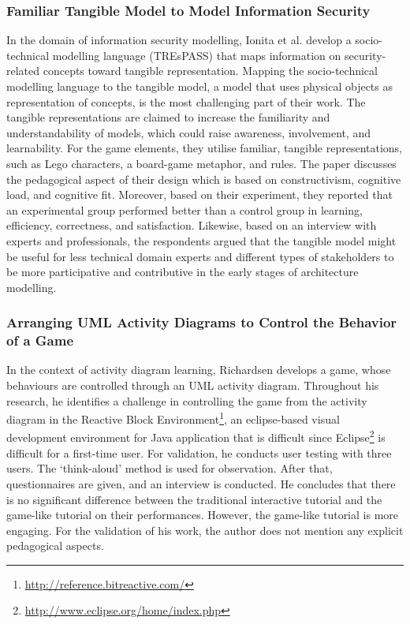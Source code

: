 \documentclass[12pt, a4paper]{report}
\begin{document}
{\subsubsection{Familiar Tangible Model to Model Information Security}
In the domain of information security modelling, Ionita et al.\cite{Ionita2015} develop a socio-technical modelling language (TREsPASS) that maps information on security-related concepts toward tangible representation. Mapping the socio-technical modelling language to the tangible model, a model that uses physical objects as representation of concepts, is the most challenging part of their work. The tangible representations are claimed to increase the familiarity and understandability of models, which could raise awareness, involvement, and learnability. For the game elements, they utilise familiar, tangible representations, such as Lego characters, a board-game metaphor, and rules. The paper discusses the pedagogical aspect of their design which is based on constructivism, cognitive load, and cognitive fit. Moreover, based on their experiment, they reported that an experimental group performed better than a control group in learning, efficiency, correctness, and satisfaction. Likewise, based on an interview with experts and professionals, the respondents argued that the tangible model might be useful for less technical domain experts and different types of stakeholders to be more participative and contributive in the early stages of architecture modelling.

\subsubsection{Arranging UML Activity Diagrams to Control the Behavior of a Game}
In the context of activity diagram learning, Richardsen \cite{Richardsen2014} develops a game, whose behaviours are controlled through an UML activity diagram. Throughout his research, he identifies a challenge in controlling the game from the activity diagram in the Reactive Block Environment\footnote{\url{http://reference.bitreactive.com/}}, an eclipse-based visual development environment for Java application that is difficult since Eclipse\footnote{\url{http://www.eclipse.org/home/index.php}} is difficult for a first-time user. For validation, he conducts user testing with three users. The `think-aloud' method is used for observation. After that, questionnaires are given, and an interview is conducted. He concludes that there is no significant difference between the traditional interactive tutorial and the game-like tutorial on their performances. However, the game-like tutorial is more engaging. For the validation of his work, the author does not mention any explicit pedagogical aspects.\\

}
\end{document}
